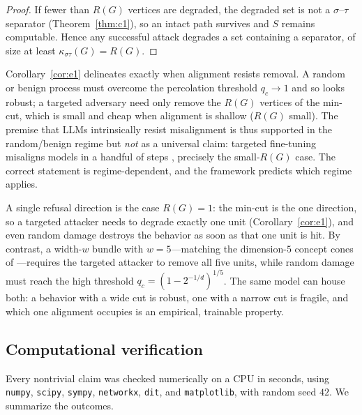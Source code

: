 \begin{proof}
If fewer than $R(G)$ vertices are degraded, the degraded set is not a
$\sigma$--$\tau$ separator (Theorem~\ref{thm:c1}), so an intact path survives and $S$
remains computable. Hence any successful attack degrades a set containing a separator,
of size at least $\kappa_{\sigma\tau}(G)=R(G)$.
\end{proof}

\begin{remark}
\label{rem:honest}
Corollary~\ref{cor:e1} delineates exactly when alignment resists removal. A random or
benign process must overcome the percolation threshold $q_c\to 1$ and so looks
robust; a targeted adversary need only remove the $R(G)$ vertices of the min-cut,
which is small and cheap when alignment is shallow ($R(G)$ small). The premise that
LLMs intrinsically resist misalignment is thus supported in the random/benign regime
but \emph{not} as a universal claim: targeted fine-tuning misaligns models in a
handful of steps \cite{qi2023finetuning,qi2024shallow}, precisely the small-$R(G)$
case. The correct statement is regime-dependent, and the framework predicts which
regime applies.
\end{remark}

\begin{example}
\label{ex:shallow}
A single refusal direction \cite{arditi2024refusal} is the case $R(G)=1$: the min-cut
is the one direction, so a targeted attacker needs to degrade exactly one unit
(Corollary~\ref{cor:e1}), and even random damage destroys the behavior as soon as that
one unit is hit. By contrast, a width-$w$ bundle with $w=5$---matching the
dimension-$5$ concept cones of \cite{wollschlager2025cones}---requires the targeted
attacker to remove all five units, while random damage must reach the high threshold
$q_c=(1-2^{-1/d})^{1/5}$. The same model can house both: a behavior with a wide cut is
robust, one with a narrow cut is fragile, and which one alignment occupies is an
empirical, trainable property.
\end{example}

\subsection{Computational verification}
\label{subsec:verify}

Every nontrivial claim was checked numerically on a CPU in seconds, using
\texttt{numpy}, \texttt{scipy}, \texttt{sympy}, \texttt{networkx}, \texttt{dit}, and
\texttt{matplotlib}, with random seed $42$. We summarize the outcomes.

